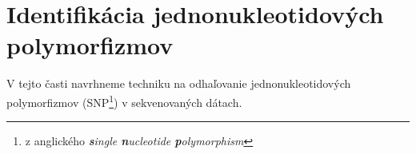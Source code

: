 \chapter{Identifikácia jednonukleotidových polymorfizmov}

\label{kap:identifikacia_SNP} %

V tejto časti navrhneme techniku na odhaľovanie jednonukleotidových
polymorfizmov (SNP\footnote{z anglického \emph{\textbf{s}ingle \textbf{n}ucleotide \textbf{p}olymorphism}}) v sekvenovaných dátach.
